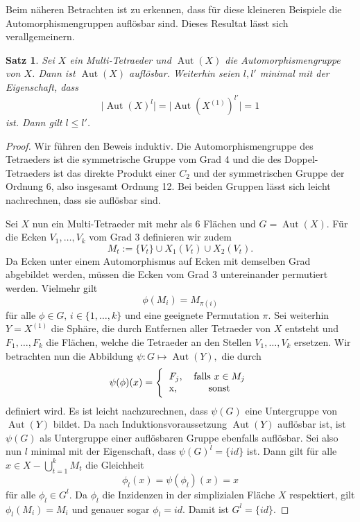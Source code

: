 \documentclass[12pt,titlepage,twoside,cleardoublepage]{article}
\theoremstyle{nummermitklammern}
\newtheorem{satz}[temp]{Satz}
\newtheorem{satz}[zahl]{Satz}
\numberwithin{equation}{section}
\DeclareMathOperator{\Aut}{Aut}
\begin{document}
Beim näheren Betrachten ist zu erkennen, dass für diese kleineren Beispiele die Automorphismengruppen auflösbar sind. Dieses Resultat lässt sich verallgemeinern. 
\begin{satz}
Sei $X$ ein Multi-Tetraeder und $\Aut(X)$ die Automorphismengruppe von $X$. Dann ist $\Aut(X)$ auflösbar.
Weiterhin seien $l,l'$ minimal mit der Eigenschaft, dass
\[
\vert \Aut(X)^l\vert=\vert \Aut(X^{(1)})^{l'}\vert =1
\] ist. Dann gilt $l\leq l'$.
\end{satz}
\begin{proof}
Wir führen den Beweis induktiv. Die Automorphismengruppe des Tetraeders ist die symmetrische Gruppe vom Grad 4 und die des Doppel-Tetraeders ist das direkte Produkt einer $C_2$ und der symmetrischen Gruppe der Ordnung 6, also insgesamt Ordnung 12. Bei beiden Gruppen lässt sich leicht nachrechnen, dass sie auflösbar sind.

Sei $X$ nun ein Multi-Tetraeder mit mehr als  6 Flächen und $G=\Aut(X)$. Für die Ecken $V_1,\ldots,V_k$ vom Grad $3$ definieren wir zudem 
\[
M_t:=\{V_t\} \cup X_1(V_t) \cup X_2(V_t).  
\] 
Da Ecken unter einem Automorphismus auf Ecken mit demselben Grad abgebildet werden, müssen die Ecken vom Grad 3 untereinander permutiert werden. Vielmehr gilt 
\[
\phi(M_i)=M_{\pi(i)} 
\]
für alle $\phi \in G,\,i\in \{1,\ldots,k\}$ und eine geeignete Permutation $\pi.$ Sei weiterhin $Y=X^{(1)}$ die Sphäre, die durch Entfernen aller Tetraeder von $X$ entsteht und $F_1,\ldots,F_k$ die Flächen, welche die Tetraeder an den Stellen $V_1,\ldots,V_k$ ersetzen. Wir betrachten nun die Abbildung $\psi:G\mapsto \Aut(Y),$ die durch  
\[
\psi(\phi)(x)=\Biggl\{
\begin{tabular}[l]{lcr}
$F_j$,&\textcolor{black}{ falls  $x\in M_j$} \\
x,& sonst\\
\end{tabular}
\]
definiert wird. Es ist leicht nachzurechnen, dass $\psi(G)$ eine Untergruppe von $\Aut(Y)$ bildet. Da nach Induktionsvoraussetzung $\Aut(Y)$ auflösbar ist, ist $\psi(G)$ als Untergruppe einer auflösbaren Gruppe ebenfalls auflösbar. 
Sei also nun $l$ minimal mit der Eigenschaft, dass $\psi(G)^l=\{id\}$ ist. Dann gilt für alle $x\in X-\bigcup_{t=1}^k M_t$ die Gleichheit 
\[
\phi_l(x)=\psi(\phi_l)(x)=x
\] für alle $\phi_l \in G^l$. Da $\phi_l$ die Inzidenzen in der simplizialen Fläche $X$ respektiert, gilt $\phi_l(M_i)=M_i$ und genauer sogar $\phi_l=id.$ Damit ist $G^l =\{id\}$.
  
\end{proof}
\end{document}
